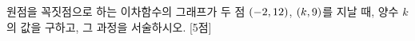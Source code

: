 원점을 꼭짓점으로 하는 이차함수의 그래프가 두 점 $(-2{,}\mkern3mu 12)$, $(k{,}\mkern3mu 9)$를 지날 때, 양수 $k$의 값을 구하고, 그 과정을 서술하시오. \mbox{[5점]}
